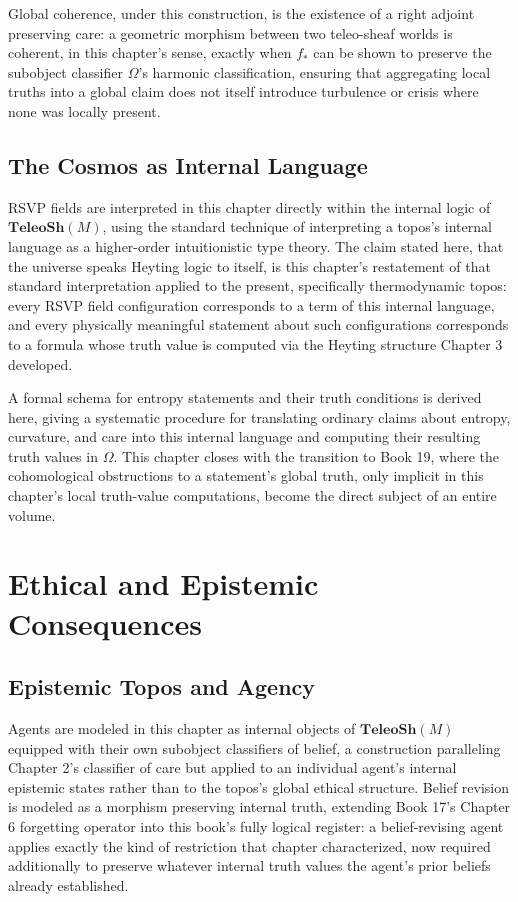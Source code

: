 Global coherence, under this construction, is the existence of a right adjoint preserving care: a geometric morphism between two teleo-sheaf worlds is coherent, in this chapter's sense, exactly when $f_{*}$ can be shown to preserve the subobject classifier $\Omega$'s harmonic classification, ensuring that aggregating local truths into a global claim does not itself introduce turbulence or crisis where none was locally present.

\chapter{The Cosmos as Internal Language}

RSVP fields are interpreted in this chapter directly within the internal logic of $\mathbf{TeleoSh}(M)$, using the standard technique of interpreting a topos's internal language as a higher-order intuitionistic type theory. The claim stated here, that the universe speaks Heyting logic to itself, is this chapter's restatement of that standard interpretation applied to the present, specifically thermodynamic topos: every RSVP field configuration corresponds to a term of this internal language, and every physically meaningful statement about such configurations corresponds to a formula whose truth value is computed via the Heyting structure Chapter 3 developed.

A formal schema for entropy statements and their truth conditions is derived here, giving a systematic procedure for translating ordinary claims about entropy, curvature, and care into this internal language and computing their resulting truth values in $\Omega$. This chapter closes with the transition to Book 19, where the cohomological obstructions to a statement's global truth, only implicit in this chapter's local truth-value computations, become the direct subject of an entire volume.

\part{Ethical and Epistemic Consequences}

\chapter{Epistemic Topos and Agency}

Agents are modeled in this chapter as internal objects of $\mathbf{TeleoSh}(M)$ equipped with their own subobject classifiers of belief, a construction paralleling Chapter 2's classifier of care but applied to an individual agent's internal epistemic states rather than to the topos's global ethical structure. Belief revision is modeled as a morphism preserving internal truth, extending Book 17's Chapter 6 forgetting operator into this book's fully logical register: a belief-revising agent applies exactly the kind of restriction that chapter characterized, now required additionally to preserve whatever internal truth values the agent's prior beliefs already established.

